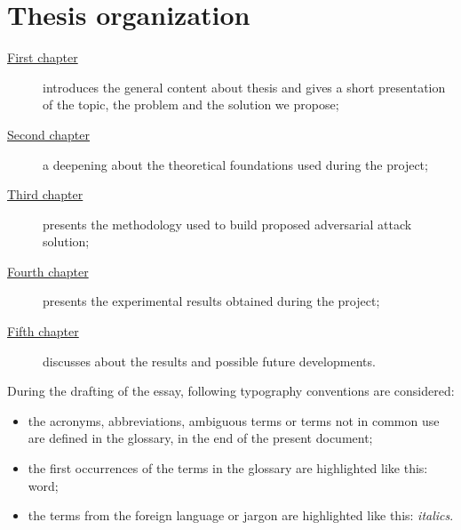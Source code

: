 \section{Thesis organization}\label{sec:thesis-organization}
\begin{description}
    \item[{\hyperref[ch:introduction]{First chapter}}] introduces the general content about thesis and gives a short presentation of the topic, the problem and the solution we propose;

    \item[{\hyperref[ch:background]{Second chapter}}] a deepening about the theoretical foundations used during the project;

    \item[{\hyperref[ch:methodology]{Third chapter}}] presents the methodology used to build proposed adversarial attack solution;

    \item[{\hyperref[ch:experimental-results]{Fourth chapter}}] presents the experimental results obtained during the project;

    \item[{\hyperref[ch:final-discussions]{Fifth chapter}}] discusses about the results and possible future developments.
\end{description}
During the drafting of the essay, following typography conventions are considered:
\begin{itemize}
    \item the acronyms, abbreviations, ambiguous terms or terms not in common use are defined in the glossary, in the end of the present document;
    \item the first occurrences of the terms in the glossary are highlighted like this: \gls{word};
    \item the terms from the foreign language or jargon are highlighted like this: \emph{italics}.
\end{itemize}